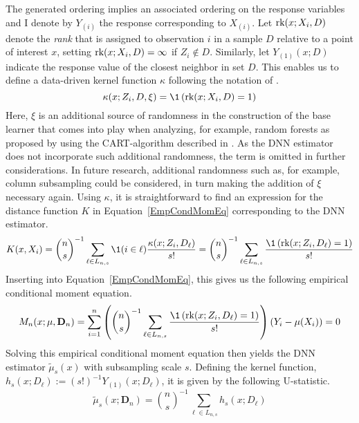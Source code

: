 The generated ordering implies an associated ordering on the response variables and I denote by $Y_{(i)}$ the response corresponding to $X_{(i)}$.
Let $\text{rk}(x; X_{i}, D)$ denote the \textit{rank} that is assigned to observation $i$ in a sample $D$ relative to a point of interest $x$, setting $\text{rk}(x; X_{i}, D) = \infty$ if $Z_{i} \not\in D$.
Similarly, let $Y_{(1)}(x; D)$ indicate the response value of the closest neighbor in set $D$.
This enables us to define a data-driven kernel function $\kappa$ following the notation of \citet{ritzwoller_simultaneous_2024}.
\begin{equation}
	\kappa(x; Z_{i}, D, \xi)
	= \1\left(\rk(x; X_{i}, D) = 1\right)
\end{equation}
Here, $\xi$ is an additional source of randomness in the construction of the base learner that comes into play when analyzing, for example, random forests as proposed by \citet{breiman_random_2001} using the CART-algorithm described in \citet{breiman_classification_2017}.
As the DNN estimator does not incorporate such additional randomness, the term is omitted in further considerations.
In future research, additional randomness such as, for example, column subsampling could be considered, in turn making the addition of $\xi$ necessary again.
Using $\kappa$, it is straightforward to find an expression for the distance function $K$ in Equation~\ref{EmpCondMomEq} corresponding to the DNN estimator.
\begin{equation}\label{eq:data_distance}
	K(x, X_{i})
	= \binom{n}{s}^{-1} \sum_{\ell \in L_{n,s}} \1(i \in \ell)\frac{\kappa(x; Z_{i}, D_{\ell})}{s!}
	= \binom{n}{s}^{-1} \sum_{\ell \in L_{n,s}} \frac{\1\left(\rk(x; Z_{i}, D_{\ell}) = 1\right)}{s!}
\end{equation}
Inserting into Equation~\ref{EmpCondMomEq}, this gives us the following empirical conditional moment equation.
\begin{equation}
	\begin{aligned}
		M_n(x; \mu, \mathbf{D}_n)
		= \sum_{i = 1}^{n}\left(\binom{n}{s}^{-1} \sum_{\ell \in L_{n,s}} \frac{\1\left(\rk(x; Z_{i}, D_{\ell}) = 1\right)}{s!}\right)\left(Y_{i} - \mu(X_{i})\right)
		= 0
	\end{aligned}
\end{equation}
Solving this empirical conditional moment equation then yields the DNN estimator $\tilde{\mu}_{s}(x)$ with subsampling scale $s$.
Defining the kernel function, $h_{s}(x; D_{\ell}) := (s!)^{-1} Y_{(1)}(x; D_{\ell})$, it is given by the following U-statistic.
\begin{equation}\label{eq:U_stat}
	\tilde{\mu}_{s}(x; \mathbf{D}_n)
	= \binom{n}{s}^{-1} \sum_{\ell \in L_{n,s}} h_{s}(x; D_{\ell})
\end{equation}
